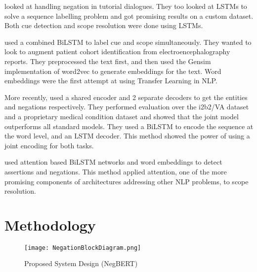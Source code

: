 \documentclass[10pt, a4paper]{article}
\begin{document}
\par {} looked at handling negation in tutorial dialogues. They too looked at LSTMs to solve a sequence labelling problem and got promising results on a custom dataset. Both cue detection and scope resolution were done using LSTMs.
\par {} used a combined BiLSTM to label cue and scope simultaneously. They wanted to look to augment patient cohort identification from electroencephalography reports. They preprocessed the text first, and then used the Gensim implementation of word2vec to generate embeddings for the text. Word embeddings were the first attempt at using Transfer Learning in NLP.
\par More recently,  used a shared encoder and 2 separate decoders to get the entities and negations respectively. They performed evaluation over the i2b2/VA dataset and a proprietary medical condition dataset and showed that the joint model outperforms all standard models. They used a BiLSTM to encode the sequence at the word level, and an LSTM decoder. This method showed the power of using a joint encoding for both tasks.
\par {} used attention based BiLSTM networks and word embeddings to detect assertions and negations. This method applied attention, one of the more promising components of architectures addressing other NLP problems, to scope resolution.


\section{Methodology}

\begin{figure}[h]
    \centering
    \texttt{[image: NegationBlockDiagram.png]}
    \caption{Proposed System Design (NegBERT)}
    \label{fig:negbert}
\end{figure}
\end{document}
